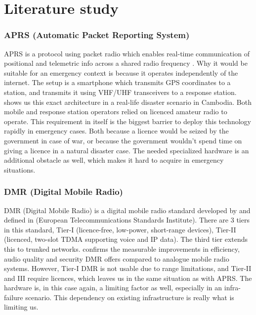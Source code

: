 \section{Literature study}%
\label{sec:literature-study}

\subsubsection{APRS (Automatic Packet Reporting System)}%
\label{subsec:aprs}
APRS is a protocol using packet radio which enables real-time communication of positional and 
telemetric info across a shared radio frequency \autocite{ManojBaker2007}.
Why it would be suitable for an emergency context is because it operates independently of the internet.
The setup is a smartphone which transmits GPS coordinates to a station, and transmits it using VHF/UHF transceivers to a response station.
\textcite{ManojBaker2007} shows us this exact architecture in a real-life disaster scenario in Cambodia. Both mobile and response station operators relied on licenced amateur radio to operate.
This requirement in itself is the biggest barrier to deploy this technology rapidly in emergency cases.
Both because a licence would be seized by the government in case of war, or because the government wouldn't spend time on giving a licence in a natural disaster case.
The needed specialized hardware is an additional obstacle as well, which makes it hard to acquire in emergency situations.

\subsubsection{DMR (Digital Mobile Radio)}
\label{subsec:DMR}
DMR (Digital Mobile Radio) is a digital mobile radio standard developed by and defined in \textcite{ETSI2023DMR} (European Telecommunications Standards Institute).
There are 3 tiers in this standard, Tier-I (licence-free, low-power, short-range devices), Tier-II (licenced, 
two-slot TDMA supporting voice and IP data). The third tier extends this to trunked networks.
\textcite{Nyawose2025DMR} confirms the measurable improvements in efficiency, audio quality and security DMR offers compared to analogue mobile radio systems.
However, Tier-I DMR is not usable due to range limitations, and Tier-II and III require licences, which leaves us in the same situation as with APRS.
The hardware is, in this case again, a limiting factor as well, especially in an infra-failure scenario.
This dependency on existing infrastructure is really what is limiting us.



